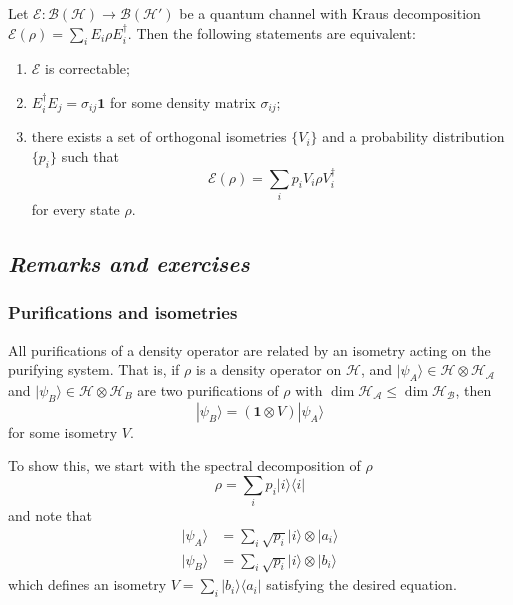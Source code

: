 \documentclass[fleqn,a4paper]{article}
\newenvironment{idea}{\everypar{\setlength{\parindent}{1.5em}}}{}
\theoremstyle{definition}
\theoremstyle{definition}
\theoremstyle{definition}
\theoremstyle{definition}
\theoremstyle{remark}
\begin{document}
\begin{idea}

Let \(\mathcal{E}\colon\mathcal{B}(\mathcal{H})\to\mathcal{B}(\mathcal{H}')\) be a quantum channel with Kraus decomposition \(\mathcal{E}(\rho)=\sum_i E_i\rho E^\dagger_i\).
Then the following statements are equivalent:

\begin{enumerate}
\def\labelenumi{\roman{enumi}.}
\item
  \(\mathcal{E}\) is correctable;
\item
  \(E_i^\dagger E_j = \sigma_{ij}\mathbf{1}\) for some density matrix \(\sigma_{ij}\);
\item
  there exists a set of orthogonal isometries \(\{V_i\}\) and a probability distribution \(\{p_i\}\) such that
  \[
      \mathcal{E} (\rho) = \sum_i p_i V_i\rho V^\dagger_i
      \]
  for every state \(\rho\).
\end{enumerate}

\end{idea}

\hypertarget{remarks-and-exercises-quantum-channels}{%
\subsection{\texorpdfstring{\emph{Remarks and exercises}}{Remarks and exercises}}\label{remarks-and-exercises-quantum-channels}}

\hypertarget{purifications-and-isometries}{%
\subsubsection{Purifications and isometries}\label{purifications-and-isometries}}

All purifications of a density operator are related by an isometry acting on the purifying system.
That is, if \(\rho\) is a density operator on \(\mathcal{H}\), and \(|\psi_A\rangle\in \mathcal{H}\otimes\mathcal{H}_\mathcal{A}\) and \(|\psi_B\rangle\in\mathcal{H}\otimes\mathcal{H}_B\) are two purifications of \(\rho\) with \(\dim\mathcal{H}_\mathcal{A}\leqslant\dim\mathcal{H}_\mathcal{B}\), then
\[
  |\psi_B\rangle=(\mathbf{1}\otimes V)|\psi_A\rangle
\]
for some isometry \(V\).

To show this, we start with the spectral decomposition of \(\rho\)
\[
  \rho = \sum_i p_i|i\rangle\langle i|
\]
and note that
\[
  \begin{aligned}
    |\psi_A\rangle
    &= \sum_i \sqrt{p_i} |i\rangle\otimes|a_i\rangle
  \\|\psi_B\rangle
    &= \sum_i \sqrt{p_i} |i\rangle\otimes|b_i\rangle
  \end{aligned}
\]
which defines an isometry \(V=\sum_i |b_i\rangle\langle a_i|\) satisfying the desired equation.
\end{document}
